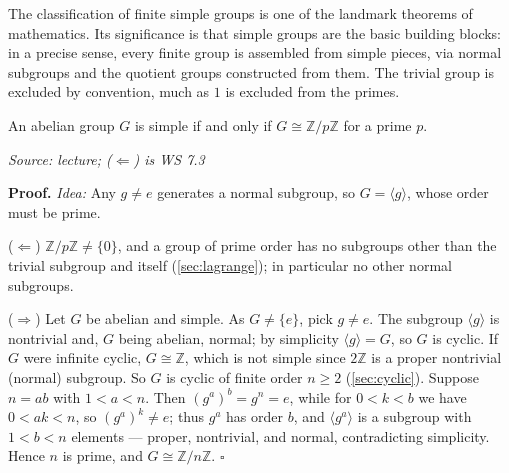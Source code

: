 \documentclass[11pt]{report}
\renewenvironment{proof}[1][Proof]{\noindent\textbf{#1.} }{\hfill$\square$\par\vspace{5pt}}
\newcommand{\srcline}[1]{\par\hfill{\footnotesize\textit{Source: #1}}}
\begin{document}
\begin{rembox}\label{rem:why-simple-groups-matter}
The classification of finite simple groups is one of the landmark theorems of mathematics. Its significance is that simple groups are the basic building blocks: in a precise sense, every finite group is assembled from simple pieces, via normal subgroups and the quotient groups constructed from them. The trivial group is excluded by convention, much as $1$ is excluded from the primes.
\end{rembox}

\begin{thmbox}\label{thm:abelian-simple-groups}
An abelian group $G$ is simple if and only if $G \cong \mathbb{Z}/p\mathbb{Z}$ for a prime $p$.
\srcline{lecture; ($\Leftarrow$) is WS 7.3}
\end{thmbox}

\begin{proof}
\textit{Idea:} Any $g \neq e$ generates a normal subgroup, so $G = \langle g \rangle$, whose order must be prime.\par
($\Leftarrow$) $\mathbb{Z}/p\mathbb{Z} \neq \{0\}$, and a group of prime order has no subgroups other than the trivial subgroup and itself (\ref{sec:lagrange}); in particular no other normal subgroups.

($\Rightarrow$) Let $G$ be abelian and simple. As $G \neq \{e\}$, pick $g \neq e$. The subgroup $\langle g \rangle$ is nontrivial and, $G$ being abelian, normal; by simplicity $\langle g \rangle = G$, so $G$ is cyclic. If $G$ were infinite cyclic, $G \cong \mathbb{Z}$, which is not simple since $2\mathbb{Z}$ is a proper nontrivial (normal) subgroup. So $G$ is cyclic of finite order $n \geq 2$ (\ref{sec:cyclic}). Suppose $n = ab$ with $1 < a < n$. Then $(g^a)^b = g^n = e$, while for $0 < k < b$ we have $0 < ak < n$, so $(g^a)^k \neq e$; thus $g^a$ has order $b$, and $\langle g^a \rangle$ is a subgroup with $1 < b < n$ elements --- proper, nontrivial, and normal, contradicting simplicity. Hence $n$ is prime, and $G \cong \mathbb{Z}/n\mathbb{Z}$.
\end{proof}
\end{document}
